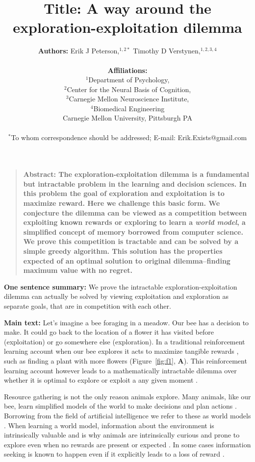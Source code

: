 \documentclass[12pt]{article}
\title{\textbf{Title:} A way around the exploration-exploitation dilemma}
\author
{\textbf{Authors:} Erik J Peterson,$^{1,2\ast}$ Timothy D Verstynen,$^{1,2,3,4}$\\
\\
\normalsize{\textbf{Affiliations:}}\\
\normalsize{$^{1}$Department of Psychology,}\\
\normalsize{$^{2}$Center for the Neural Basis of Cognition,}\\
\normalsize{$^{3}$Carnegie Mellon Neuroscience Institute,}\\
\normalsize{$^{4}$Biomedical Engineering}\\
\normalsize{Carnegie Mellon University, Pittsburgh PA}\\
\\
\normalsize{$^\ast$To whom correspondence should be addressed; E-mail:  Erik.Exists@gmail.com}
}
\date{}
\newenvironment{sciabstract}{%
\begin{quote} \bf}
{\end{quote}}
\begin{document}
 
\baselineskip24pt

\maketitle 

\begin{sciabstract}
  \textbf{Abstract:} The exploration-exploitation dilemma is a fundamental but intractable problem in the learning and decision sciences. In this problem the goal of exploration and exploitation is to maximize reward. Here we challenge this basic form. We conjecture the dilemma can be viewed as a competition between exploiting known rewards or exploring to learn a \emph{world model}, a simplified concept of memory borrowed from computer science. We prove this competition is tractable and can be solved by a simple greedy algorithm. This solution has the properties expected of an optimal solution to original dilemma--finding maximum value with no regret.
\end{sciabstract}

\textbf{One sentence summary:} We prove the intractable exploration-exploitation dilemma can actually be solved by viewing exploitation and exploration as separate goals, that are in competition with each other.

\textbf{Main text:} Let's imagine a bee foraging in a meadow. Our bee has a decision to make. It could go back to the location of a flower it has visited before (exploitation) or go somewhere else (exploration). In a traditional reinforcement learning account when our bee explores it acts to maximize tangible rewards \cite{Sutton2018}, such as finding a plant with more flowers (Figure~\ref{fig:f1}, \textbf{A}). This reinforcement learning account however leads to a mathematically intractable dilemma over whether it is optimal to explore or exploit a any given moment \cite{Thrun1992a,Dayan1996,Findling2018,Gershman2018b}. 

Resource gathering is not the only reason animals explore. Many animals, like our bee, learn simplified models of the world to make decisions and plan actions \cite{Ahilan2019,Poucet1993}. Borrowing from the field of artificial intelligence we refer to these as world models \cite{Schmidhuber2019,Sutton2018,Schmidhuber1991}. When learning a world model, information about the environment is intrinsically valuable and is why animals are intrinsically curious \cite{Mehlhorn2015,Gupta2006,Berger-Tal2014,Gottlieb2018,Schwartenbeck2019,Pathak2017} and prone to explore even when no rewards are present or expected \cite{Hughes1997}. In some cases information seeking is known to happen even if it explicitly leads to a loss of reward \cite{Wang2019}. 
\end{document}
